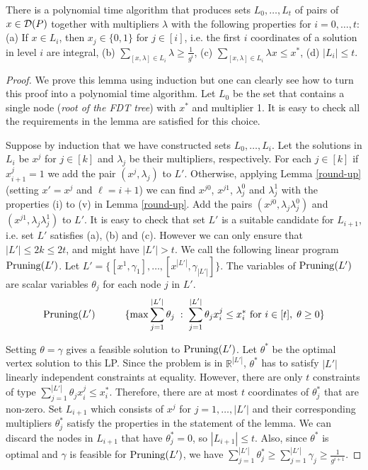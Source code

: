 \begin{lemma}\label{prune}
	There is a polynomial time algorithm that produces sets $L_0,\ldots,L_t$ of pairs of $x\in \operatorname{\mathcal{D}}(P)$ together with multipliers $\lambda$ with the following properties for $i=0,\ldots,t$:
	(a) If $x\in L_i$, then $x_j \in \{0,1\}$ for $j\in [i]$, i.e. the first $i$ coordinates of a solution in level $i$ are integral, (b) $\sum_{[x,\lambda]\in L_i} \lambda\geq\frac{1}{g^i}$, (c) $\sum_{[x,\lambda]\in L_i}\lambda x \leq x^*$, (d) $|L_i|\leq t$.
\end{lemma}
\begin{proof}
	We prove this lemma using induction but one can clearly see how to turn this proof into a polynomial time algorithm. Let $L_0$ be the set that contains a single node (\textit{root of the FDT tree}) with $x^*$ and multiplier 1. It is easy to check all the requirements in the lemma are satisfied for this choice.
	
	Suppose by induction that we have constructed sets $L_0,\ldots,L_i$. Let the solutions in $L_i$ be $x^j$ for $j\in [k]$ and $\lambda_j$ be their multipliers, respectively. For each $j\in[k]$ if $x^j_{i+1}=1$ we add the pair $(x^j,\lambda_j)$ to $L'$. Otherwise,	applying Lemma \ref{round-up} (setting $x'= x^j$ and $\ell = i+1$) we can find $x^{j0}$, $x^{j1}$, $\lambda^0_j$ and $\lambda^1_j$ with the properties (i) to (v) in Lemma \ref{round-up}. Add the pairs  $(x^{j0} ,\lambda_j\lambda^0_j)$ and  $(x^{j1} ,\lambda_j\lambda^1_j)$ to $L'$. It is easy to check that set $L'$ is a suitable candidate for $L_{i+1}$, i.e. set $L'$ satisfies (a), (b) and (c). However we can only ensure that $|L'|\leq 2k\leq 2t$, and might have $|L'|>t$. We call the following linear program $\operatorname{{{Pruning}}}(L')$. Let $L' = \{[x^1,\gamma_1],\ldots,[x^{|L'|},\gamma_{|L'|}]\}$. The variables of $\operatorname{{{Pruning}}}(L')$ are scalar variables $\theta_j$ for each node $j$ in $L'$.  
		\begin{equation}
		\operatorname{{{Pruning}}}(L')\quad\quad\quad \{\max \sum_{j=1}^{|L'|} \theta_j\;:\; \sum_{j=1}^{|L'|} \theta_j x^j_i\leq x^*_i \mbox{ for $i\in [t]$},\; \theta\geq 0 \}
		\end{equation}
		
		Setting $\theta = \gamma$ gives a feasible solution to $\operatorname{{{Pruning}}}(L')$. Let $\theta^*$ be the optimal vertex solution to this LP. Since the problem is in $\mathbb{R}^{|L'|}$,  $\theta^*$ has to satisfy $|L'|$ linearly independent constraints at equality. However, there are only $t$ constraints of type $ \sum_{j=1}^{|L'|} \theta_j x^j_i\leq x^*_i$. Therefore, there are at most $t$ coordinates of $\theta^*_j$ that are non-zero. Set $L_{i+1}$ which consists of $x^j$ for $j=1,\ldots,|L'|$ and their corresponding multipliers $\theta^*_j$ satisfy the properties in the statement of the lemma. We can discard the nodes in $L_{i+1}$ that have $\theta^*_j=0$, so $|L_{i+1}| \leq t$. Also, since $\theta^*$ is optimal and $\gamma$ is feasible for $\operatorname{{{Pruning}}}(L')$, we have $\sum_{j=1}^{|L'|} \theta^*_j \geq \sum_{j=1}^{|L'|}\gamma_j \geq \frac{1}{g^{i+1}}$. \end{proof}
	
